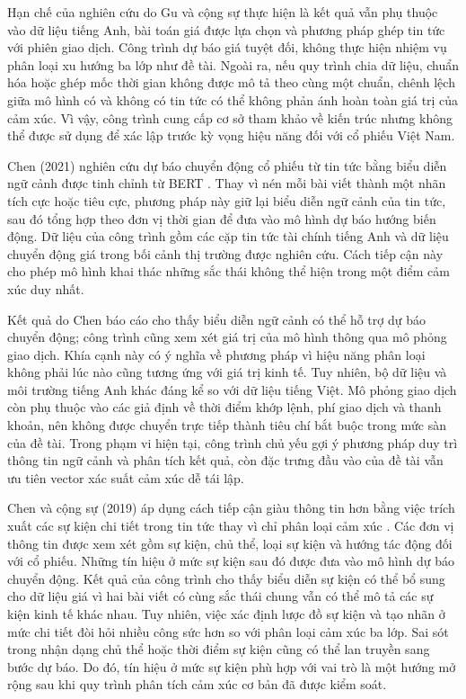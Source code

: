 \documentclass[12pt, a4paper, oneside]{report}
\begin{document}
Hạn chế của nghiên cứu do Gu và cộng sự thực hiện là kết quả vẫn phụ thuộc vào dữ liệu
tiếng Anh, bài toán giá được lựa chọn và phương pháp ghép tin tức với phiên giao dịch.
Công trình dự báo giá tuyệt đối, không thực hiện nhiệm vụ phân loại xu hướng ba lớp như
đề tài. Ngoài ra, nếu quy trình chia dữ liệu, chuẩn hóa hoặc ghép mốc thời gian không
được mô tả theo cùng một chuẩn, chênh lệch giữa mô hình có và không có tin tức có thể
không phản ánh hoàn toàn giá trị của cảm xúc. Vì vậy, công trình cung cấp cơ sở tham
khảo về kiến trúc nhưng không thể được sử dụng để xác lập trước kỳ vọng hiệu năng đối
với cổ phiếu Việt Nam.

Chen (2021) nghiên cứu dự báo chuyển động cổ phiếu từ tin tức bằng biểu diễn ngữ cảnh
được tinh chỉnh từ BERT \cite{Chen2021_210708721v1}. Thay vì nén mỗi bài viết thành
một nhãn tích cực hoặc tiêu cực, phương pháp này giữ lại biểu diễn ngữ cảnh của tin tức,
sau đó tổng hợp theo đơn vị thời gian để đưa vào mô hình dự báo hướng biến động. Dữ liệu
của công trình gồm các cặp tin tức tài chính tiếng Anh và dữ liệu chuyển động giá trong
bối cảnh thị trường được nghiên cứu. Cách tiếp cận này cho phép mô hình khai thác những
sắc thái không thể hiện trong một điểm cảm xúc duy nhất.

Kết quả do Chen báo cáo cho thấy biểu diễn ngữ cảnh có thể hỗ trợ dự báo chuyển động;
công trình cũng xem xét giá trị của mô hình thông qua mô phỏng giao dịch. Khía cạnh này
có ý nghĩa về phương pháp vì hiệu năng phân loại không phải lúc nào cũng tương ứng với
giá trị kinh tế. Tuy nhiên, bộ dữ liệu và môi trường tiếng Anh khác đáng kể so với dữ
liệu tiếng Việt. Mô phỏng giao dịch còn phụ thuộc vào các giả định về thời điểm khớp
lệnh, phí giao dịch và thanh khoản, nên không được chuyển trực tiếp thành tiêu chí bắt
buộc trong mức sàn của đề tài. Trong phạm vi hiện tại, công trình chủ yếu gợi ý phương
pháp duy trì thông tin ngữ cảnh và phân tích kết quả, còn đặc trưng đầu vào của đề tài
vẫn ưu tiên vector xác suất cảm xúc dễ tái lập.

Chen và cộng sự (2019) áp dụng cách tiếp cận giàu thông tin hơn bằng việc trích xuất
các sự kiện chi tiết trong tin tức thay vì chỉ phân loại cảm xúc
\cite{Chen2019_191005078v1}. Các đơn vị thông tin được xem xét gồm sự kiện, chủ thể,
loại sự kiện và hướng tác động đối với cổ phiếu. Những tín hiệu ở mức sự kiện sau đó
được đưa vào mô hình dự báo chuyển động. Kết quả của công trình cho thấy biểu diễn sự
kiện có thể bổ sung cho dữ liệu giá vì hai bài viết có cùng sắc thái chung vẫn có thể
mô tả các sự kiện kinh tế khác nhau. Tuy nhiên, việc xác định lược đồ sự kiện và tạo
nhãn ở mức chi tiết đòi hỏi nhiều công sức hơn so với phân loại cảm xúc ba lớp. Sai sót
trong nhận dạng chủ thể hoặc thời điểm sự kiện cũng có thể lan truyền sang bước dự báo.
Do đó, tín hiệu ở mức sự kiện phù hợp với vai trò là một hướng mở rộng sau khi quy trình
phân tích cảm xúc cơ bản đã được kiểm soát.
\end{document}
